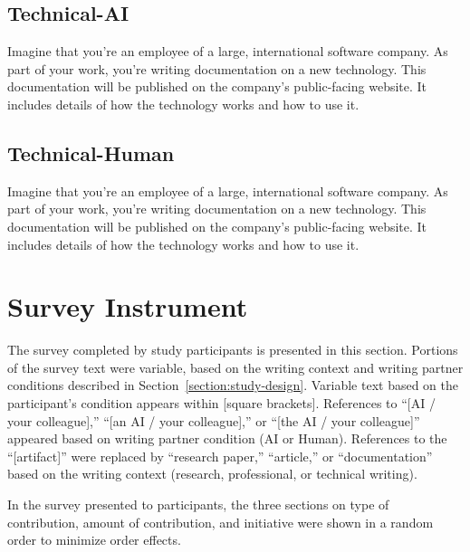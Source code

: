 \subsection{Technical-AI}
Imagine that you’re an employee of a large, international software company. As part of your work, you're writing documentation on a new technology. This documentation will be published on the company's public-facing website. It includes details of how the technology works and how to use it.

\subsection{Technical-Human}
Imagine that you’re an employee of a large, international software company. As part of your work, you're writing documentation on a new technology. This documentation will be published on the company's public-facing website. It includes details of how the technology works and how to use it.

\section{Survey Instrument}
\label{appendix:survey-instrument}

The survey completed by study participants is presented in this section. Portions of the survey text were variable, based on the writing context and writing partner conditions described in Section~\ref{section:study-design}. Variable text based on the participant's condition appears within [square brackets]. References to ``[AI / your colleague],'' ``[an AI / your colleague],'' or ``[the AI / your colleague]'' appeared based on writing partner condition (AI or Human). References to the ``[artifact]'' were replaced by ``research paper,'' ``article,'' or ``documentation'' based on the writing context (research, professional, or technical writing).

In the survey presented to participants, the three sections on type of contribution, amount of contribution, and initiative were shown in a random order to minimize order effects.


